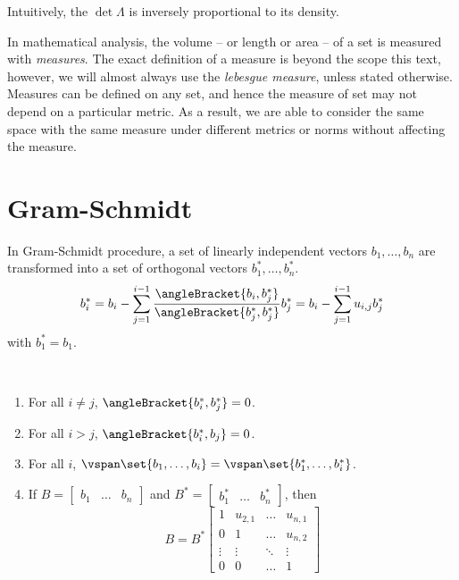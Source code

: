 Intuitively, the \(\det \Lambda\) is inversely proportional to its density. 

\begin{remark}
    In mathematical analysis, the volume -- or length or area -- of a set is measured with \textit{measures}. The exact definition of a measure is beyond the scope this text, however, we will almost always use the \textit{lebesgue measure}, unless stated otherwise. Measures can be defined on any set, and hence the measure of set may not depend on a particular metric. As a result, we are able to consider the same space with the same measure under different metrics or norms without affecting the measure. 
\end{remark}
\section{Gram-Schmidt}
In Gram-Schmidt procedure, a set of linearly independent vectors \(b_1, \dots, b_n\) are transformed into a set of orthogonal vectors \(b_1^{\ast}, \dots, b_n^{\ast}\).
\begin{equation*}
    b_i^{\ast} = b_i - \sum_{j = 1}^{i - 1} \dfrac{\angleBracket{b_i,b_j^{\ast}}}{\angleBracket{b_j^{\ast}, b_j^{\ast}}} b_j^{\ast} = b_i - \sum_{j = 1}^{i - 1} u_{i,j} b_j^{\ast}
\end{equation*}
with \(b_1^{\ast} = b_1\).
\begin{proposition}
    \ 
    \begin{enumerate}
        \item For all \(i \neq j\), \(\angleBracket{b_i^{\ast},b_j^{\ast}} = 0\).
        \item For all \(i > j\), \(\angleBracket{b_i^{\ast}, b_j} = 0\).
        \item For all \(i\), \(\vspan \set{b_1, \dots, b_i} = \vspan \set{b_1^{\ast}, \dots, b_i^{\ast}}\).
        \item If \(B = \begin{bmatrix}
            b_1 & \dots & b_n
        \end{bmatrix}\) and \(B^{\ast} = \begin{bmatrix}
            b_1^{\ast} & \dots & b_n^{\ast}
        \end{bmatrix}\), then 
        \begin{equation*}
            B = B^{\ast} \begin{bmatrix}
                1 & u_{2,1} & \dots & u_{n,1}\\
                0 & 1 & \dots & u_{n,2}\\
                \vdots& \vdots& \ddots& \vdots \\
                0 & 0 & \dots & 1
            \end{bmatrix}
        \end{equation*}
    \end{enumerate}
\end{proposition}
